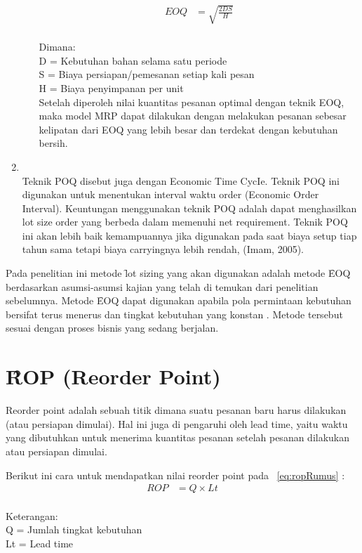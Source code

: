 \begin{enumerate}
\begin{enumerate}
		\noindent \begin{align}\label{eq:eoqRumus}
			EOQ &= \sqrt{\frac{2DS}{H}}
		\end{align}\\
		Dimana:\\
		D = Kebutuhan bahan selama satu periode\\
		S = Biaya persiapan/pemesanan setiap kali pesan\\
		H = Biaya penyimpanan per unit\\
		Setelah diperoleh nilai kuantitas pesanan optimal dengan teknik EOQ, maka model MRP dapat dilakukan dengan melakukan pesanan sebesar kelipatan dari EOQ yang lebih besar dan terdekat dengan kebutuhan bersih.
		
	\end{enumerate}

	\item {}\\
	Teknik POQ disebut juga dengan Economic Time CycIe. Teknik POQ ini digunakan untuk menentukan interval waktu order (Economic Order Interval). Keuntungan menggunakan teknik POQ adalah dapat menghasilkan lot size order yang berbeda dalam memenuhi net requirement. Teknik POQ ini akan lebih baik kemampuannya jika digunakan pada saat biaya setup tiap tahun sama tetapi biaya carryingnya lebih rendah, (Imam, 2005).
\end{enumerate}

Pada penelitian ini metode \f{lot sizing} yang akan digunakan adalah metode \f{EOQ} berdasarkan asumsi-asumsi kajian yang telah di temukan dari penelitian sebelumnya. Metode \f{EOQ} dapat digunakan apabila pola permintaan kebutuhan bersifat terus menerus dan tingkat kebutuhan yang konstan \cite{Ibrahim, Fuad}. Metode tersebut sesuai dengan proses bisnis yang sedang berjalan.

\section{\f{ROP (Reorder Point)}}
Reorder point adalah sebuah titik dimana suatu pesanan baru harus dilakukan (atau persiapan dimulai). Hal ini juga di pengaruhi oleh lead time, yaitu waktu yang dibutuhkan untuk menerima kuantitas pesanan setelah pesanan dilakukan atau persiapan dimulai.

Berikut ini cara untuk mendapatkan nilai reorder point pada \equ~\ref{eq:ropRumus} \cite{Ibrahim}:
\noindent \begin{align}\label{eq:ropRumus}
	ROP &= Q \times Lt
\end{align}\\
Keterangan:\\
Q = Jumlah tingkat kebutuhan\\
Lt = Lead time


